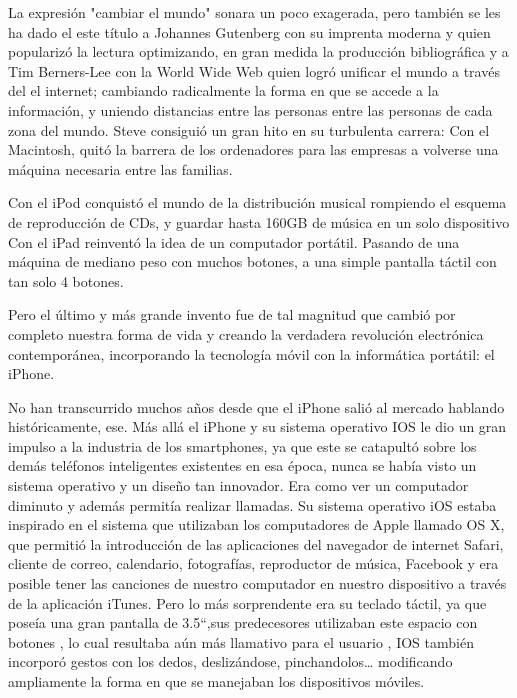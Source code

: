 La expresión "cambiar el mundo" sonara un poco exagerada,
pero también se les ha dado el este título a Johannes Gutenberg
con su imprenta moderna y quien popularizó la lectura
optimizando, en gran medida la producción bibliográfica y a
Tim Berners-Lee con la World Wide Web quien logró unificar el
mundo a través del el internet; cambiando radicalmente la forma
en que se accede a la información, y uniendo distancias entre las
personas entre las personas de cada zona del mundo. Steve
consiguió un gran hito en su turbulenta carrera:
Con el Macintosh, quitó la barrera de los ordenadores para las
empresas a volverse una máquina necesaria entre las familias.

Con el iPod conquistó el mundo de la distribución musical
rompiendo el esquema de reproducción de CDs, y guardar hasta
160GB de música en un solo dispositivo
Con el iPad reinventó la idea de un computador portátil. Pasando
de una máquina de mediano peso con muchos botones, a una
simple pantalla táctil con tan solo 4 botones.

Pero el último y más grande invento fue de tal magnitud que
cambió por completo nuestra forma de vida y creando la
verdadera revolución electrónica contemporánea, incorporando
la tecnología móvil con la informática portátil: el iPhone.

No han transcurrido muchos años desde que el iPhone salió al
mercado hablando históricamente, ese. Más allá el iPhone y su
sistema operativo IOS le dio un gran impulso a la industria de
los smartphones, ya que este se catapultó sobre los demás
teléfonos inteligentes existentes en esa época, nunca se había
visto un sistema operativo y un diseño tan innovador. Era como
ver un computador diminuto y además permitía realizar
llamadas. Su sistema operativo iOS estaba inspirado en el
sistema que utilizaban los computadores de Apple llamado OS X,
que permitió la introducción de las aplicaciones del navegador
de internet Safari, cliente de correo, calendario, fotografías,
reproductor de música, Facebook y era posible tener las
canciones de nuestro computador en nuestro dispositivo a
través de la aplicación iTunes. Pero lo más sorprendente era su
teclado táctil, ya que poseía una gran pantalla de 3.5“,sus
predecesores utilizaban este espacio con botones , lo cual
resultaba aún más llamativo para el usuario , IOS también
incorporó gestos con los dedos, deslizándose, pinchandolos…
modificando ampliamente la forma en que se manejaban los
dispositivos móviles.

